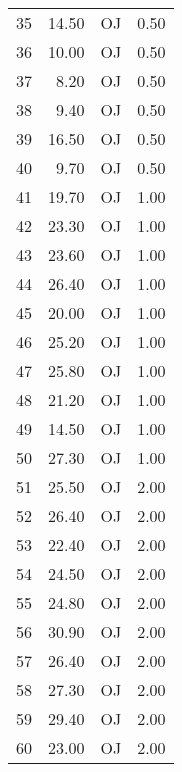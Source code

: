 \documentclass{article}\usepackage[]{graphicx}\usepackage[]{color}
\begin{document}
\begin{table}[ht]
\begin{tabular}{|l|r|r|r|}
  35 & 14.50 & OJ & 0.50 \\ 
  36 & 10.00 & OJ & 0.50 \\ 
  37 & 8.20 & OJ & 0.50 \\ 
  38 & 9.40 & OJ & 0.50 \\ 
  39 & 16.50 & OJ & 0.50 \\ 
  40 & 9.70 & OJ & 0.50 \\ 
  41 & 19.70 & OJ & 1.00 \\ 
  42 & 23.30 & OJ & 1.00 \\ 
  43 & 23.60 & OJ & 1.00 \\ 
  44 & 26.40 & OJ & 1.00 \\ 
  45 & 20.00 & OJ & 1.00 \\ 
  46 & 25.20 & OJ & 1.00 \\ 
  47 & 25.80 & OJ & 1.00 \\ 
  48 & 21.20 & OJ & 1.00 \\ 
  49 & 14.50 & OJ & 1.00 \\ 
  50 & 27.30 & OJ & 1.00 \\ 
  51 & 25.50 & OJ & 2.00 \\ 
  52 & 26.40 & OJ & 2.00 \\ 
  53 & 22.40 & OJ & 2.00 \\ 
  54 & 24.50 & OJ & 2.00 \\ 
  55 & 24.80 & OJ & 2.00 \\ 
  56 & 30.90 & OJ & 2.00 \\ 
  57 & 26.40 & OJ & 2.00 \\ 
  58 & 27.30 & OJ & 2.00 \\ 
  59 & 29.40 & OJ & 2.00 \\ 
  60 & 23.00 & OJ & 2.00 \\ 
   \hline
\end{tabular}
\end{table}
\end{document}
